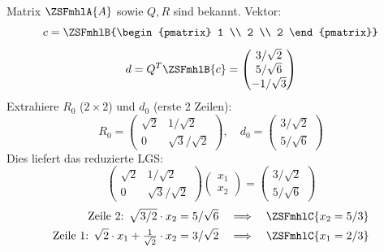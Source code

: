 \begin{defbox}
  Matrix $\ZSFmhlA{A}$ sowie $Q, R$ sind bekannt. Vektor:
  \[
  c = \ZSFmhlB{\begin{pmatrix} 1 \\ 2 \\ 2 \end{pmatrix}}
  \]
  \[
  d = Q^T \ZSFmhlB{c} = \begin{pmatrix} 3/\sqrt{2} \\ 5/\sqrt{6} \\ -1/\sqrt{3} \end{pmatrix}
  \]
  Extrahiere $R_0$ ($2 \times 2$) und $d_0$ (erste 2 Zeilen):
  \[
  R_0 = \begin{pmatrix} \sqrt{2} & 1/\sqrt{2} \\ 0 & \sqrt{3}/\sqrt{2} \end{pmatrix}, \quad d_0 = \begin{pmatrix} 3/\sqrt{2} \\ 5/\sqrt{6} \end{pmatrix}
  \]
  Dies liefert das reduzierte LGS:
  \[
  \begin{pmatrix} \sqrt{2} & 1/\sqrt{2} \\ 0 & \sqrt{3}/\sqrt{2} \end{pmatrix} \begin{pmatrix} x_1 \\ x_2 \end{pmatrix} = \begin{pmatrix} 3/\sqrt{2} \\ 5/\sqrt{6} \end{pmatrix}
  \]
  \[
  \begin{aligned}
  \text{Zeile 2: } \sqrt{3/2} \cdot x_2 &= 5/\sqrt{6} \quad \Longrightarrow \quad \ZSFmhlC{x_2 = 5/3} \\
  \text{Zeile 1: } \sqrt{2} \cdot x_1 + \tfrac{1}{\sqrt{2}} \cdot x_2 &= 3/\sqrt{2} \quad \Longrightarrow \quad \ZSFmhlC{x_1 = 2/3}
  \end{aligned}
  \]
\end{defbox}
